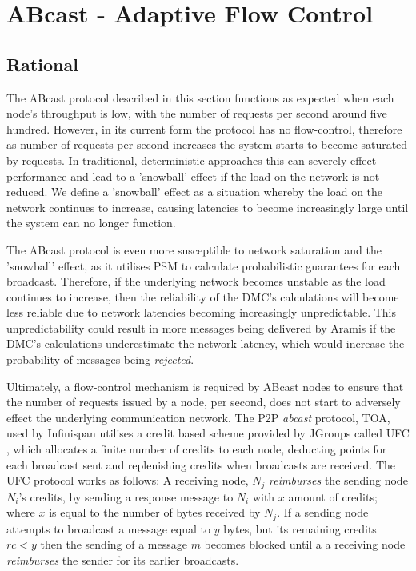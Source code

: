 \chapter{ABcast - Adaptive Flow Control}

    \graphicspath{{Chapter5-FlowControl/Figs/Vector/}{Chapter5-FlowControl/Figs/}}

\section{Rational}
The \textsf{ABcast} protocol described in this section functions as expected when each node's throughput is low, with the number of requests per second around five hundred.  However, in its current form the protocol has no flow-control, therefore as number of requests per second increases the system starts to become saturated by requests.  In traditional, deterministic approaches this can severely effect performance and lead to a 'snowball' effect if the load on the network is not reduced.  We define a 'snowball' effect as a situation whereby the load on the network continues to increase, causing latencies to become increasingly large until the system can no longer function.  

The \textsf{ABcast} protocol is even more susceptible to network saturation and the 'snowball' effect, as it utilises PSM to calculate probabilistic guarantees for each broadcast. Therefore, if the underlying network becomes unstable as the load continues to increase, then the reliability of the DMC's calculations will become less reliable due to network latencies becoming increasingly unpredictable.  This unpredictability could result in more messages being delivered by \textsf{Aramis} if the DMC's calculations underestimate the network latency, which would increase the probability of messages being \emph{rejected}.  

Ultimately, a flow-control mechanism is required by \textsf{ABcast} nodes to ensure that the number of requests issued by a node, per second, does not start to adversely effect the underlying communication network.  The P2P \emph{abcast} protocol, TOA, used by Infinispan utilises a credit based scheme provided by JGroups called \textsf{UFC} \citep{JGroupsUFC}, which allocates a finite number of credits to each node, deducting points for each broadcast sent and replenishing credits when broadcasts are received.  The \textsf{UFC} protocol works as follows: A receiving node, $N_j$ \emph{reimburses} the sending node $N_i$'s credits, by sending a response message to $N_i$ with $x$ amount of credits; where $x$ is equal to the number of bytes received by $N_j$.  If a sending node  attempts to broadcast a message equal to $y$ bytes, but its remaining credits $rc < y$ then the sending of a message $m$ becomes blocked until a a receiving node \emph{reimburses} the sender for its earlier broadcasts.  

